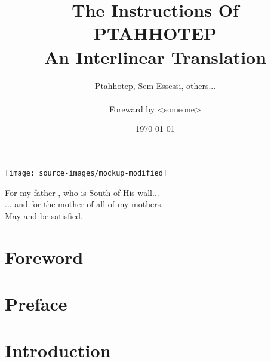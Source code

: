 \documentclass[a4paper,pagesize,8pt,pointlessnumbers,normalheadings,oneside]{book}
\title{
	\Large The Instructions Of\\
	\Huge \textbf{PTAHHOTEP}\\
	\vspace{2mm}
	\normalsize An Interlinear Translation}
\author{Ptahhotep, Sem Essessi, others...\\\\Foreward by <someone>}
\date{\today}
\begin{document}
\maketitle

\vspace*{\fill}
\begin{center}
\texttt{[image: source-images/mockup-modified]}
\end{center}
\vspace*{\fill}
\pagebreak

\vspace*{\fill}
\begin{center}
For my father , who is South of His wall...\\
\vspace{7.5mm}
... and for  the mother of all of my mothers.\\
\vspace{15mm}
May  and  be satisfied.\\
\end{center}
\vspace*{\fill}

\tableofcontents

\markboth{}{}

\newlength\q
\setlength{}

\chapter*{Foreword}

\markboth{}{}

\chapter*{Preface}

\markboth{}{}

\chapter*{Introduction}


\pagebreak

\printindex
\end{document}
